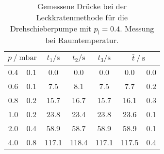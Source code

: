 \begin{table} 
\centering 
\caption{Gemessene Drücke bei der Leckkratenmethode für die Drehschieberpumpe mit $p_{\mathrm{l}}=0.4$. Messung bei Raumtemperatur.} 
\label{tab: leck_dreh_leck_0.4.pdf} 
\begin{tabular}{S[table-format=1.1]@{${}\pm{}$} S[table-format=1.1] S S S S[table-format=1.1]@{${}\pm{}$} S[table-format=1.1] } 
\toprule  
{} & {$t_1 / \si{ \second}$} & {$t_2 / \si{ \second}$} & {$t_3 / \si{ \second}$} &  \\ 
 & 0.1 & 0.0 & 0.0 & 0.0 & 0.0 & 0.0\\ 
0.6 & 0.1 & 7.5 & 8.1 & 7.5 & 7.7 & 0.2\\ 
0.8 & 0.2 & 15.7 & 16.7 & 15.7 & 16.1 & 0.3\\ 
1.0 & 0.2 & 23.8 & 23.4 & 23.8 & 23.6 & 0.1\\ 
2.0 & 0.4 & 58.9 & 58.7 & 58.9 & 58.9 & 0.1\\ 
4.0 & 0.8 & 117.1 & 118.4 & 117.1 & 117.5 & 0.4\\ 
\bottomrule 
\end{tabular} 
\end{table}